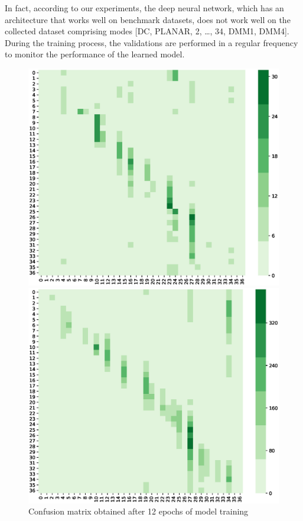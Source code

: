 In fact, according to our experiments,
the deep neural network, which has 
an architecture that works well on 
benchmark datasets, does not work well on 
the collected dataset comprising modes
[DC, PLANAR, 2, \ldots, 34, DMM1, DMM4].
During the training process, the validations
are performed in a regular frequency to monitor 
the performance of the learned model.
\begin{figure}
    \begin{minipage}{0.49\textwidth}
        \includegraphics[width=\textwidth,height=\textheight,keepaspectratio]{Figures/confusion-matrix/ckpt-10342.eps}
        \caption[Confusion matrix obtained after 12 epochs of model training]
        {Confusion matrix obtained after 12 epochs of model training}
        \label{fig:cm-after-12-epochs}
    \end{minipage}
    \hspace{\fill} %
    \begin{minipage}{0.49\textwidth}
        \includegraphics[width=\textwidth,height=\textheight,keepaspectratio]{Figures/confusion-matrix/ckpt-20622.eps}

\end{minipage}
\end{figure}
